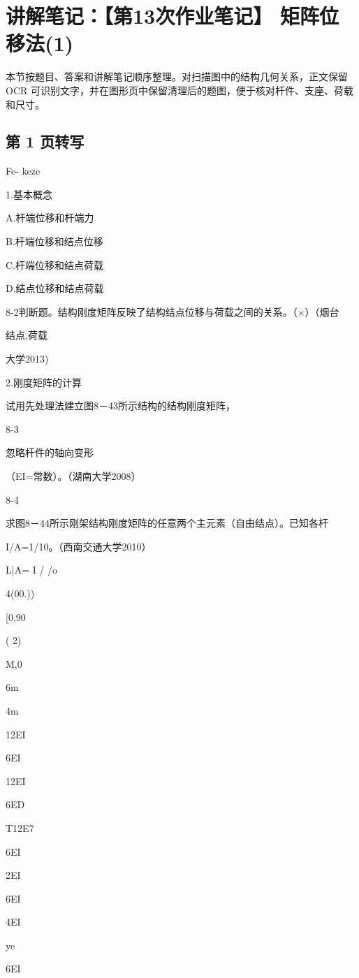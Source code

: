 \section{讲解笔记：【第13次作业笔记】 矩阵位移法(1)}
\begin{analysisbox}
本节按题目、答案和讲解笔记顺序整理。对扫描图中的结构几何关系，正文保留 OCR 可识别文字，并在图形页中保留清理后的题图，便于核对杆件、支座、荷载和尺寸。
\end{analysisbox}
\subsection*{第 1 页转写}
Fe- keze

1.基本概念

A.杆端位移和杆端力

B.杆端位移和结点位移

C.杆端位移和结点荷载

D.结点位移和结点荷载

8-2判断题。结构刚度矩阵反映了结构结点位移与荷载之间的关系。（$\times$）（烟台

结点,荷载

大学2013)

2.刚度矩阵的计算

试用先处理法建立图8－43所示结构的结构刚度矩阵，

8-3

忽略杆件的轴向变形

（EI=常数）。（湖南大学2008）

8-4

求图8－44所示刚架结构刚度矩阵的任意两个主元素（自由结点）。已知各杆

I/A=1/10。（西南交通大学2010）

L|A= I / /o

4(00.))

[0,90

( 2)

M,0

6m

4m

12EI

6EI

12EI

6ED

T12E7

6EI

2EI

6EI

4EI

ye

6EI

